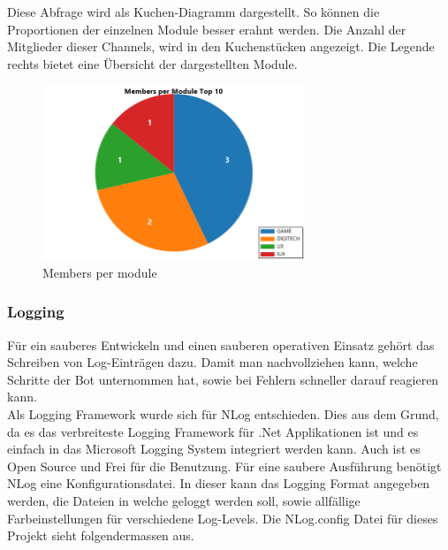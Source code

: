\documentclass[a4paper, table]{article}
\begin{document}
Diese Abfrage wird als Kuchen-Diagramm dargestellt. So können die Proportionen der einzelnen Module besser erahnt werden.
Die Anzahl der Mitglieder dieser Channels, wird in den Kuchenstücken angezeigt.
Die Legende rechts bietet eine Übersicht der dargestellten Module.

\begin{figure}[h]
    \centering
    \includegraphics[width=0.7\textwidth]{img/membersPerModule.png}
    \caption{Members per module}
    \label{fig:members-per-module}
\end{figure}
\clearpage

\subsubsection{Logging}
Für ein sauberes Entwickeln und einen sauberen operativen Einsatz gehört das Schreiben von Log-Einträgen dazu.
Damit man nachvollziehen kann, welche Schritte der Bot unternommen hat, sowie bei Fehlern schneller darauf reagieren kann.\\
Als Logging Framework wurde sich für NLog entschieden.\autocite{}
Dies aus dem Grund, da es das verbreiteste Logging Framework für .Net Applikationen ist und es einfach in das Microsoft Logging System integriert werden kann.
Auch ist es Open Source und Frei für die Benutzung.
Für eine saubere Ausführung benötigt NLog eine Konfigurationsdatei.
In dieser kann das Logging Format angegeben werden, die Dateien in welche geloggt werden soll, sowie allfällige Farbeinstellungen für verschiedene Log-Levels.
Die NLog.config Datei für dieses Projekt sieht folgendermassen aus.
\end{document}
